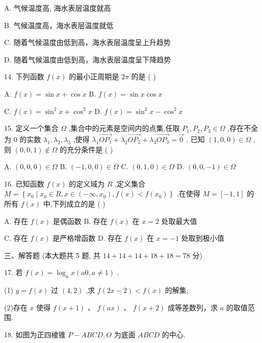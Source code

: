 \documentclass[10pt]{article}
\begin{document}
A. 气候温度高, 海水表层温度就高

B. 气候温度高，海水表层温度就低

C. 随着气候温度由低到高，海水表层温度呈上升趋势

D. 随着气候温度由低到高，海水表层温度呈下降趋势

14. 下列函数 \(f\left( x\right)\) 的最小正周期是 \({2\pi }\) 的是 ( )

A. \(f\left( x\right)  = \sin x + \cos x\) B. \(f\left( x\right)  = \sin x\cos x\)

C. \(f\left( x\right)  = {\sin }^{2}x + {\cos }^{2}x\) D. \(f\left( x\right)  = {\sin }^{2}x - {\cos }^{2}x\)

15. 定义一个集合 \(\Omega\) ,集合中的元素是空间内的点集,任取 \({P}_{1},{P}_{2},{P}_{3} \in  \Omega\) ,存在不全为 0 的实数 \({\lambda }_{1},{\lambda }_{2},{\lambda }_{3}\) ,使得 \({\lambda }_{1}\overrightarrow{O{P}_{1}} + {\lambda }_{2}\overrightarrow{O{P}_{2}} + {\lambda }_{3}\overrightarrow{O{P}_{3}} = \overrightarrow{0}\) . 已知 \(\left( {1,0,0}\right)  \in  \Omega\) ,则 \(\left( {0,0,1}\right)  \notin  \Omega\) 的充分条件是 ( )

A. \(\left( {0,0,0}\right)  \in  \Omega\) B. \(\left( {-1,0,0}\right)  \in  \Omega\) C. \(\left( {0,1,0}\right)  \in  \Omega\) D. \(\left( {0,0, - 1}\right)  \in  \Omega\)

16. 已知函数 \(f\left( x\right)\) 的定义域为 \(R\) ,定义集合 \(M = \left\{  {{x}_{0} \mid  {x}_{0} \in  R,x \in  \left( {-\infty ,{x}_{0}}\right) ,f\left( x\right)  < f\left( {x}_{0}\right) }\right\}\) ,在使得 \(M = \left\lbrack  {-1,1}\right\rbrack\) 的所有 \(f\left( x\right)\) 中,下列成立的是 ( )

A. 存在 \(f\left( x\right)\) 是偶函数 B. 存在 \(f\left( x\right)\) 在 \(x = 2\) 处取最大值

C. 存在 \(f\left( x\right)\) 是严格增函数 D. 存在 \(f\left( x\right)\) 在 \(x =  - 1\) 处取到极小值

三、解答题 (本大题共 5 题, 共 \({14} + {14} + {14} + {18} + {18} = {78}\) 分)

17. 若 \(f\left( x\right)  = {\log }_{a}x\left( {{a0},a \neq  1}\right)\) .

(1) \(y = f\left( x\right)\) 过 \(\left( {4,2}\right)\) ,求 \(f\left( {{2x} - 2}\right)  < f\left( x\right)\) 的解集;

(2)存在 \(x\) 使得 \(f\left( {x + 1}\right)\) 、 \(f\left( {ax}\right)\) 、 \(f\left( {x + 2}\right)\) 成等差数列，求 \(a\) 的取值范围.

18. 如图为正四棱锥 \(P - {ABCD},O\) 为底面 \({ABCD}\) 的中心.
\end{document}
